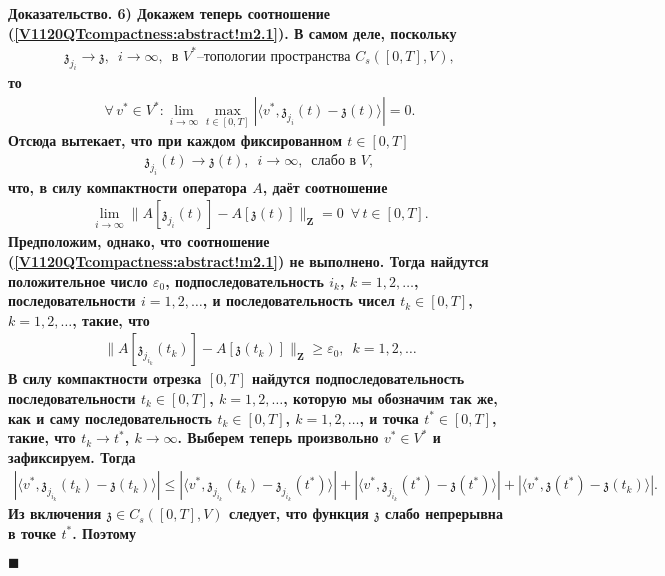 \documentclass{report}
\newenvironment{Proof}{\par\noindent\bf Доказательство.\rm}{ $\blacksquare$\par}
\begin{document}
\begin{Proof}
6) Докажем теперь соотношение (\ref{V1120QTcompactness:abstract!m2.1}). В самом деле, поскольку
\begin{gather*}
\mathfrak{z}_{j_i}\to\mathfrak{z},\,\,\,i\to\infty,\,\,\,\mbox{в $V^*$--топологии пространства $C_s([0,T],V)$},
\end{gather*}
то
\begin{gather}\label{V1120QTcompactness:abstract!m10}
\forall\,v^*\in V^*:\lim\limits_{i\to\infty}\max\limits_{t\in[0,T]}|\langle v^*,\mathfrak{z}_{j_i}(t)-\mathfrak{z}(t)\rangle|=0.
\end{gather}
Отсюда вытекает, что при каждом фиксированном $t\in[0,T]$
\begin{gather}\label{V1120QTcompactness:abstract!m11}
\mathfrak{z}_{j_i}(t)\to\mathfrak{z}(t),\,\,\,i\to\infty,\,\,\,\mbox{слабо в $V$},
\end{gather}
что, в силу компактности оператора $A$, даёт соотношение
\begin{gather}\label{V1120QTcompactness:abstract!m12}
\lim\limits_{i\to\infty}\|A[\mathfrak{z}_{j_i}(t)]-A[\mathfrak{z}(t)]\|_{\mathbf{Z}}=0\,\,\,\forall\,t\in[0,T].
\end{gather}
Предположим, однако, что соотношение (\ref{V1120QTcompactness:abstract!m2.1}) не выполнено. Тогда найдутся положительное число $\varepsilon_0$, подпоследовательность $i_k$, $k=1,2,\dots$,
последовательности $i=1,2,\dots$, и последовательность чисел $t_k\in[0,T]$, $k=1,2,\dots$, такие, что
\begin{gather}\label{V1120QTcompactness:abstract!m13}
\|A[\mathfrak{z}_{j_{i_k}}(t_k)]-A[\mathfrak{z}(t_k)]\|_{\mathbf{Z}}\geqslant\varepsilon_0,\,\,\,k=1,2,\dots
\end{gather}
В силу компактности отрезка $[0,T]$ найдутся подпоследовательность последовательности $t_k\in[0,T]$, $k=1,2,\dots$, которую мы обозначим так же, как и саму последовательность $t_k\in[0,T]$,
$k=1,2,\dots$, и точка $t^*\in[0,T]$, такие, что $t_k\to t^*$, $k\to\infty$. Выберем теперь произвольно $v^*\in V^*$ и зафиксируем. Тогда
\begin{gather}\label{V1120QTcompactness:abstract!m13?}
|\langle v^*,\mathfrak{z}_{j_{i_k}}(t_k)-\mathfrak{z}(t_k)\rangle|\leqslant|\langle v^*,\mathfrak{z}_{j_{i_k}}(t_k)-\mathfrak{z}_{j_{i_k}}(t^*)\rangle|+
|\langle v^*,\mathfrak{z}_{j_{i_k}}(t^*)-\mathfrak{z}(t^*)\rangle|+|\langle v^*,\mathfrak{z}(t^*)-\mathfrak{z}(t_k)\rangle|.
\end{gather}
Из включения $\mathfrak{z}\in C_s([0,T],V)$ следует, что функция $\mathfrak{z}$ слабо непрерывна в точке $t^*$. Поэтому

\end{Proof}
\end{document}

